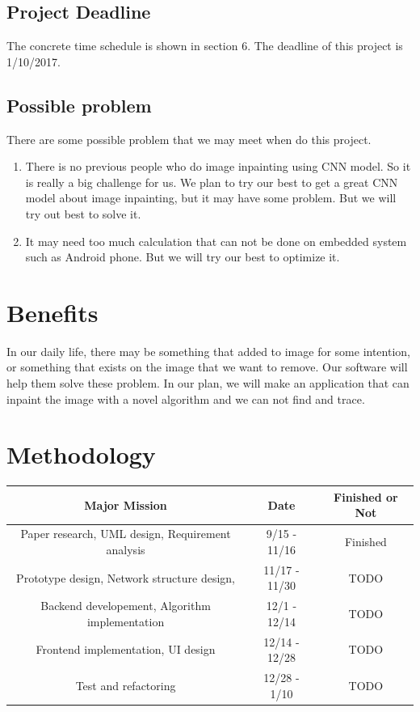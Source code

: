 \documentclass[12pt]{article}
\begin{document}
\subsection{Project Deadline}
\qquad The concrete time schedule is shown in section 6. The deadline of this project is 1/10/2017.
\subsection{Possible problem}
There are some possible problem that we may meet when do this project.
\begin{enumerate}[option]
	\item There is no previous people who do image inpainting using CNN model. So it is really a big challenge for us. We plan to try our best to get a great CNN model about image inpainting, but it may have some problem. But we will try out best to solve it.
	\item It may need too much calculation that can not be done on embedded system such as Android phone. But we will try our best to optimize it. 
\end{enumerate}
\section{Benefits}
\qquad In our daily life, there may be something that added to image for some intention, or something that exists on the image that we want to remove. Our software will help them solve these problem. In our plan, we will make an application that can inpaint the image with a novel algorithm and we can not find and trace. 
\section{Methodology}
\begin{table}[H]
	\centering
	\begin{tabular}{|c|c|c|}
		\hline
		Major Mission & Date & Finished or Not \\
		\hline
		Paper research, UML design, Requirement analysis
		& 9/15 - 11/16& Finished \\
		\hline
		 Prototype design, Network structure design, 
		 & 11/17 - 11/30 & TODO \\
		\hline
		 Backend developement, Algorithm implementation & 12/1 - 12/14 & TODO\\
		\hline
		 Frontend implementation, UI design & 12/14 - 12/28 & TODO\\
		\hline
		 Test and refactoring & 12/28 - 1/10 & TODO\\
		\hline 
		
	\end{tabular}
\end{table}
\end{document}
